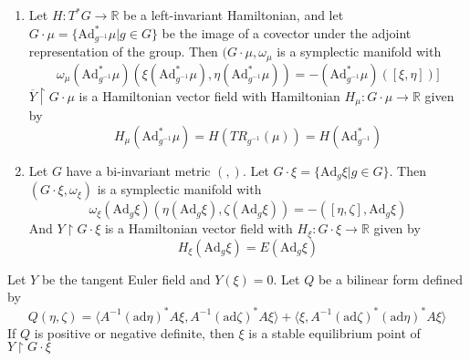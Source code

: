 \begin{thm}
\begin{enumerate}
    \item Let $H: T^*G \to \mathbb{R}$ be a left-invariant Hamiltonian, and let $G \cdot \mu = \{\mathrm{Ad}^*_{g^{-1}} \mu \vert g \in G \}$ be the image of a covector under the adjoint representation of the group. Then $(G \cdot \mu, \omega_{\mu}$ is a symplectic manifold with 
    \begin{equation}\omega_{\mu}(\mathrm{Ad}^*_{g^{-1}} \mu)\left(\xi (\mathrm{Ad}^*_{g^{-1}}\mu), \eta (\mathrm{Ad}^*_{g^{-1}}\mu) \right) = - \left( \mathrm{Ad}^*_{g^{-1}}\mu \right) ([\xi, \eta])]\end{equation}
    $\overline{Y}\restriction G \cdot \mu$ is a Hamiltonian vector field with Hamiltonian $H_{\mu}:G\cdot \mu \to \mathbb{R}$ given by 
    \begin{equation}H_{\mu}\left( \mathrm{Ad}^*_{g^{-1}} \mu \right) = H \left( TR_{g^{-1}} (\mu) \right) = H \left( \mathrm{Ad}^*_{g^{-1}} \right)\end{equation}
    \item Let $G$ have a bi-invariant metric $(,)$. Let $G \cdot \xi = \{ \mathrm{Ad}_g \xi \vert g \in G \}$. Then $(G \cdot \xi, \omega_{\xi})$ is a symplectic manifold with 
    \begin{equation}\omega_{\xi} \left( \mathrm{Ad}_g \xi \right) \left( \eta (\mathrm{Ad}_g \xi ), \zeta (\mathrm{Ad}_g \xi) \right) = -\left( [\eta, \zeta], \mathrm{Ad}_g \xi \right)\end{equation}
    And $Y \restriction G \cdot \xi$ is a Hamiltonian vector field with $H_{\xi}:G \cdot \xi \to \mathbb{R}$ given by
    \begin{equation}H_{\xi} \left( \mathrm{Ad}_g \xi \right) = E \left( \mathrm{Ad}_g \xi \right)\end{equation}
\end{enumerate}
\end{thm}

\begin{thm}[Arnold]

Let $Y$ be the tangent Euler field and $Y(\xi)=0$. Let $Q$ be a bilinear form defined by 
\begin{equation}Q(\eta, \zeta) = \langle A^{-1} (\mathrm{ad}\eta)^* A \xi, A^{-1}(\mathrm{ad}\zeta)^* A \xi \rangle + \langle \xi, A^{-1} (\mathrm{ad}\zeta)^* (\mathrm{ad}\eta)^* A \xi \rangle\end{equation}
If $Q$ is positive or negative definite, then $\xi$ is a stable equilibrium point of $Y \restriction G \cdot \xi$
\end{thm}

